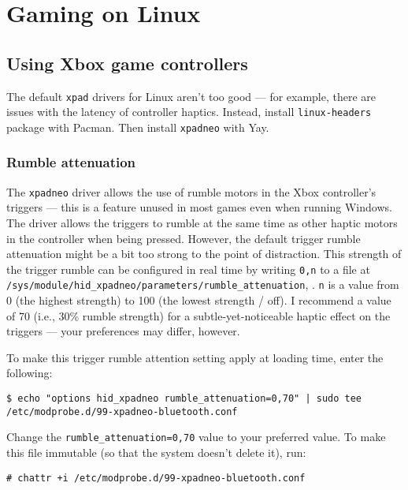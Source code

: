\documentclass[a4paper]{article}
\begin{document}
\section{Gaming on Linux}

\subsection{Using Xbox game controllers}

The default \lstinline|xpad| drivers for Linux aren't too good --- for example, there are issues with the latency of controller haptics.
Instead, install \lstinline|linux-headers| package with Pacman.
Then install \lstinline|xpadneo| with Yay.

\subsubsection{Rumble attenuation}

The \lstinline|xpadneo| driver allows the use of rumble motors in the Xbox controller's triggers --- this is a feature unused in most games even when running Windows.
The driver allows the triggers to rumble at the same time as other haptic motors in the controller when being pressed.
However, the default trigger rumble attenuation might be a bit too strong to the point of distraction.
This strength of the trigger rumble can be configured in real time by writing \lstinline|0,n| to a file at \lstinline|/sys/module/hid_xpadneo/parameters/rumble_attenuation|, \cite{xpadneo-troubleshooting}.
\lstinline|n| is a value from 0 (the highest strength) to 100 (the lowest strength / off).
I recommend a value of 70 (i.e., 30\% rumble strength) for a subtle-yet-noticeable haptic effect on the triggers --- your preferences may differ, however.

To make this trigger rumble attention setting apply at loading time, enter the following: \cite{xpadneo-troubleshooting}

\begin{lstlisting}
$ echo "options hid_xpadneo rumble_attenuation=0,70" | sudo tee /etc/modprobe.d/99-xpadneo-bluetooth.conf
\end{lstlisting}
Change the \lstinline|rumble_attenuation=0,70| value to your preferred value.
To make this file immutable (so that the system doesn't delete it), run:
\begin{lstlisting}
# chattr +i /etc/modprobe.d/99-xpadneo-bluetooth.conf
\end{lstlisting}
\end{document}
